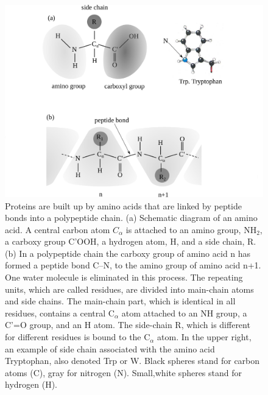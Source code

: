 \begin{subappendices}
       \begin{figure}
        \centerline{\includegraphics*[width=15cm,angle=0]{nutshell/figs/fig3D5}}
        \caption{Proteins are built up by amino acids that are linked by peptide bonds into a polypeptide chain. (a) Schematic diagram of an amino acid. A central carbon atom $C_\alpha$ is attached to an amino group, NH$_2$, a carboxy group C'OOH, a hydrogen atom, H, and a side chain, R. (b) In a polypeptide chain the carboxy group of amino acid n has formed a peptide bond C--N, to the amino group of amino acid n+1. One water molecule is eliminated in this process. The repeating units, which are called residues, are divided into main-chain atoms and side chains. The main-chain part, which is identical in all residues, contains a central C$_\alpha$ atom attached to an NH group, a C'=O group, and an H atom. The side-chain R, which is different for different residues is bound to the C$_\alpha$ atom. In the upper right, an example of side chain associated with the amino acid Tryptophan, also denoted Trp or W. Black spheres stand for carbon atoms (C), gray for nitrogen (N). Small,white spheres stand for hydrogen (H).}\label{fig2.D.7}
        \end{figure}
       
  
 
 
 
 
 
 
 

\end{subappendices}
